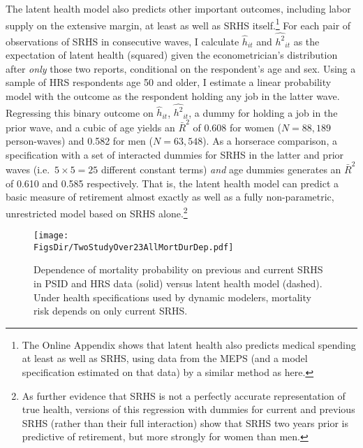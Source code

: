 \documentclass[12pt,pdftex,letterpaper]{article}
\newcommand{\Health}{h}
\newcommand{\RootDir}{..}
\newcommand{\FigsDir}{\RootDir/Figures}
\begin{document}
The latent health model also predicts other important outcomes, including labor supply on the extensive margin, at least as well as SRHS itself.\footnote{The Online Appendix shows that latent health also predicts medical spending at least as well as SRHS, using data from the MEPS (and a model specification estimated on that data) by a similar method as here.} For each pair of observations of SRHS in consecutive waves, I calculate $\widehat{\Health}_{it}$ and $\widehat{\Health^2}_{it}$ as the expectation of latent health (squared) given the econometrician's distribution after \textit{only} those two reports, conditional on the respondent's age and sex. Using a sample of HRS respondents age 50 and older, I estimate a linear probability model with the outcome as the respondent holding any job in the latter wave.  Regressing this binary outcome on $\widehat{\Health}_{it}$,  $\widehat{\Health^2}_{it}$, a dummy for holding a job in the prior wave, and a cubic of age yields an $\bar{R}^2$ of 0.608 for women ($N=88,189$ person-waves) and 0.582 for men ($N=63,548$). As a horserace comparison, a specification with a set of interacted dummies for SRHS in the latter and prior waves (i.e.\ $5 \times 5 = 25$ different constant terms) \textit{and} age dummies generates an $\bar{R}^2$ of 0.610 and 0.585 respectively.  That is, the latent health model can predict a basic measure of retirement almost exactly as well as a fully non-parametric, unrestricted model based on SRHS alone.\footnote{As further evidence that SRHS is not a perfectly accurate representation of true health, versions of this regression with dummies for current and previous SRHS (rather than their full interaction) show that SRHS two years prior is predictive of retirement, but more strongly for women than men.}

\begin{figure}
	\centering
	\texttt{[image: \\FigsDir/TwoStudyOver23AllMortDurDep.pdf]}
	\caption{Dependence of mortality probability on previous and current SRHS in PSID and HRS data (solid) versus latent health model (dashed). Under health specifications used by dynamic modelers, mortality risk depends on only current SRHS.}\label{fig:MortDurDep}
\end{figure}
\end{document}
